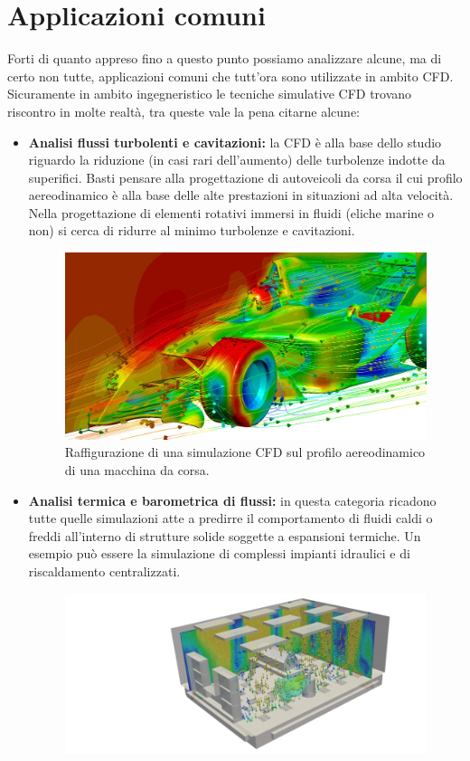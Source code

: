 \section{Applicazioni comuni}
Forti di quanto appreso fino a questo punto possiamo analizzare alcune, ma di certo non tutte, applicazioni comuni che tutt'ora sono utilizzate in ambito CFD.
Sicuramente in ambito ingegneristico le tecniche simulative CFD trovano riscontro in molte realtà, tra queste vale la pena citarne alcune:
\begin{itemize}
    \item \textbf{Analisi flussi turbolenti e cavitazioni:} la CFD è alla base dello studio riguardo la riduzione (in casi rari dell'aumento) delle turbolenze indotte da superifici. 
    Basti pensare alla progettazione di autoveicoli da corsa il cui profilo aereodinamico è alla base delle alte prestazioni in situazioni ad alta velocità. Nella progettazione di 
    elementi rotativi immersi in fluidi (eliche marine o non) si cerca di ridurre al minimo turbolenze e cavitazioni.
\begin{figure}[H]
    \centering
    \includegraphics[width=\linewidth]{figure/racecar.jpg}
    \caption{Raffigurazione di una simulazione CFD sul profilo aereodinamico di una macchina da corsa.}
\end{figure}
    \item \textbf{Analisi termica e barometrica di flussi:} in questa categoria ricadono tutte quelle simulazioni atte a predirre il comportamento di fluidi caldi o freddi all'interno di strutture
    solide soggette a espansioni termiche. Un esempio può essere la simulazione di complessi impianti idraulici e di riscaldamento centralizzati.
    \begin{figure}[H]
        \centering
        \includegraphics[width=\linewidth]{figure/HVAC-system.jpg}

\end{figure}
\end{itemize}
